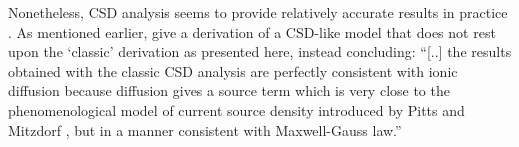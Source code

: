 Nonetheless, CSD analysis seems to provide relatively accurate results in practice \cite{Bedard2011}. As mentioned earlier, \citeauthor{Bedard2011} give a derivation of a CSD-like model that does not rest upon the `classic' derivation as presented here, instead concluding: ``[..] the results obtained with the classic CSD analysis are perfectly consistent with ionic diffusion because diffusion gives a source term which is very close to the phenomenological model of current source density introduced by Pitts and Mitzdorf \cite{Mitzdorf1985,Pitts1952}, but in a manner consistent
with Maxwell-Gauss law.'' \cite{Bedard2011}
